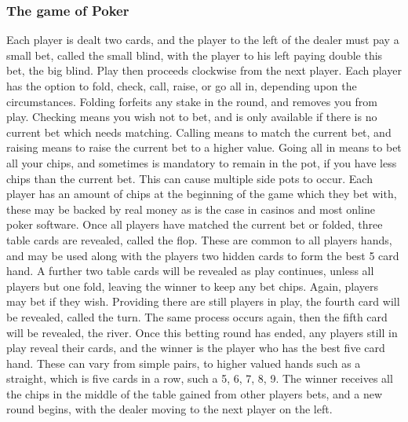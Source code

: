 \subsubsection{The game of Poker}
Each player is dealt two cards, and the player to the left of the dealer must
pay a small bet, called the small blind, with the player to his left paying 
double this bet, the big blind. Play then proceeds clockwise from the next
player. Each player has the option to fold, check, call, raise, or go all in,
depending upon the circumstances. Folding forfeits any stake in the round, and
removes you from play. Checking means you wish not to bet, and is only
available if there is no current bet which needs matching. Calling means to
match the current bet, and raising means to raise the current bet to a higher
value. Going all in means to bet all your chips, and sometimes is mandatory to
remain in the pot, if you have less chips than the current bet. This can cause
multiple side pots to occur. Each player has an amount of chips at the 
beginning of the game which they bet with, these may be backed by real money as
is the case in casinos and most online poker software. Once all players have
matched the current bet or folded, three table cards are revealed, called
the flop. These are common to all players hands, and may be used along with
the players two hidden cards to form the best 5 card hand. A further two table
cards will be revealed as play continues, unless all players but one fold,
leaving the winner to keep any bet chips. Again, players may bet if they wish.
Providing there are still players in play, the fourth card will be revealed, 
called the turn. The same process occurs again, then the fifth card will be
revealed, the river. Once this betting round has ended, any players still
in play reveal their cards, and the winner is the player who has the best
five card hand. These can vary from simple pairs, to higher valued hands such
as a straight, which is five cards in a row, such a 5, 6, 7, 8, 9. The winner
receives all the chips in the middle of the table gained from other players
bets, and a new round begins, with the dealer moving to the next player on the
left.
